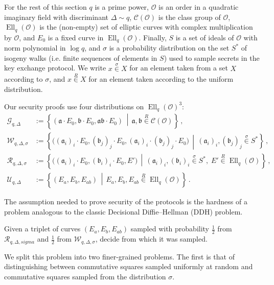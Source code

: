 \documentclass{llncs}
\newcommand{\Cl}{\mathcal{C}}
\renewcommand{\O}{\mathcal{O}}
\newcommand{\suchthat}{\,\middle\vert\,}
\renewcommand{\frak}{\mathfrak}
\newcommand{\rand}[1]{\overset{#1}{∈}}
\newcommand{\uni}{\rand{R}}
\DeclareMathOperator{\Ell}{Ell}
\begin{document}
For the rest of this section $q$ is a prime power, $\O$ is an order in
a quadratic imaginary field with discriminant $Δ\sim q$, $\Cl(\O)$ is
the class group of $\O$, $\Ell_q(\O)$ is the (non-empty) set of
elliptic curves with complex multiplication by $\O$, and $E_0$ is a
fixed curve in $\Ell_q(\O)$. Finally, $S$ is a set of ideals of $\O$
with norm polynomial in $\log q$, and $σ$ is a probability
distribution on the set $S^*$ of isogeny walks (i.e. finite
sequences of elements in $S$) used to sample secrets in the key exchange
protocol.  
We write $x\rand{σ} X$ for an element taken from a set $X$
according to $σ$, 
and %
$x\uni X$ for an element taken according to the uniform distribution.

Our security proofs use four distributions on $\Ell_q(\O)^3$:
\begin{align*}
    \mathcal{G}_{q,Δ} 
    & := 
    \left\{
        (\frak a·E_0,\frak b·E_0,\frak{ab}·E_0)
        \suchthat 
        \frak a,\frak b\uni\Cl(\O)
    \right\}
    \,, \\
    \mathcal{W}_{q,Δ,σ} 
    & := 
    \left\{
        \bigl((\frak a_i)_i·E_0,(\frak b_j)_j·E_0,(\frak a_i)_i·(\frak b_j)_j·E_0\bigr)
        \suchthat 
        (\frak a_i)_i,(\frak b_j)_j\rand{σ}S^*
    \right\}
    \,, \\
    \mathcal{R}_{q,Δ,σ} 
    & := 
    \left\{
        \bigl((\frak a_i)_i·E_0,(\frak b_i)_i·E_0,E'\bigr)
        \suchthat
        (\frak a_i)_i,(\frak b_i)_i\rand{σ}S^*,\; E'\uni\Ell_q(\O)
    \right\}
    \,, \\
    \mathcal{U}_{q,Δ} 
    & :=
    \left\{
        (E_a,E_b,E_{ab}) 
        \suchthat 
        E_a,E_b,E_{ab}\uni\Ell_q(\O)
    \right\}
    \,.
\end{align*}

The assumption needed to prove security of the protocols is 
the hardness of a problem analogous to 
the classic Decisional Diffie--Hellman (DDH) problem.

\begin{definition}
    Given a triplet of curves $(E_a,E_b,E_{ab})$
    sampled with probability $\frac{1}{2}$ 
    from $\mathcal{R}_{q,\Delta,sigma}$
    and $\frac{1}{2}$ from $\mathcal{W}_{q,\Delta,\sigma}$,
    decide from which it was sampled. 
\end{definition}

We split this problem into two finer-grained problems. 
The first is that of distinguishing between 
commutative squares sampled uniformly at random 
and commutative squares sampled from the distribution $σ$.
\end{document}
